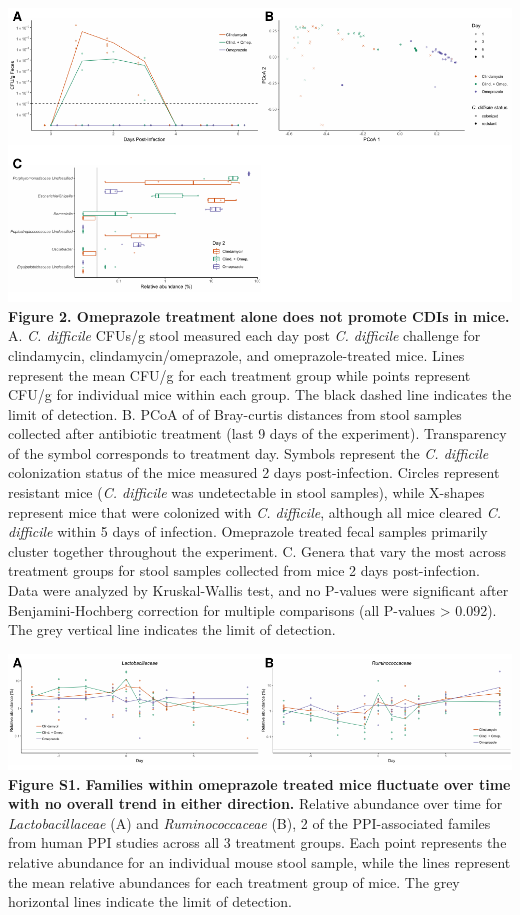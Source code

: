 \documentclass[11pt,]{article}
\begin{document}
\includegraphics{figure_2.pdf} \textbf{Figure 2. Omeprazole treatment
alone does not promote CDIs in mice.} A. \emph{C. difficile} CFUs/g
stool measured each day post \emph{C. difficile} challenge for
clindamycin, clindamycin/omeprazole, and omeprazole-treated mice. Lines
represent the mean CFU/g for each treatment group while points represent
CFU/g for individual mice within each group. The black dashed line
indicates the limit of detection. B. PCoA of of Bray-curtis distances
from stool samples collected after antibiotic treatment (last 9 days of
the experiment). Transparency of the symbol corresponds to treatment
day. Symbols represent the \emph{C. difficile} colonization status of
the mice measured 2 days post-infection. Circles represent resistant
mice (\emph{C. difficile} was undetectable in stool samples), while
X-shapes represent mice that were colonized with \emph{C. difficile},
although all mice cleared \emph{C. difficile} within 5 days of
infection. Omeprazole treated fecal samples primarily cluster together
throughout the experiment. C. Genera that vary the most across treatment
groups for stool samples collected from mice 2 days post-infection. Data
were analyzed by Kruskal-Wallis test, and no P-values were significant
after Benjamini-Hochberg correction for multiple comparisons (all
P-values \textgreater{} 0.092). The grey vertical line indicates the
limit of detection.

\newpage

\includegraphics{figure_s1.pdf} \textbf{Figure S1. Families within
omeprazole treated mice fluctuate over time with no overall trend in
either direction.} Relative abundance over time for
\emph{Lactobacillaceae} (A) and \emph{Ruminococcaceae} (B), 2 of the
PPI-associated familes from human PPI studies across all 3 treatment
groups. Each point represents the relative abundance for an individual
mouse stool sample, while the lines represent the mean relative
abundances for each treatment group of mice. The grey horizontal lines
indicate the limit of detection.
\end{document}
